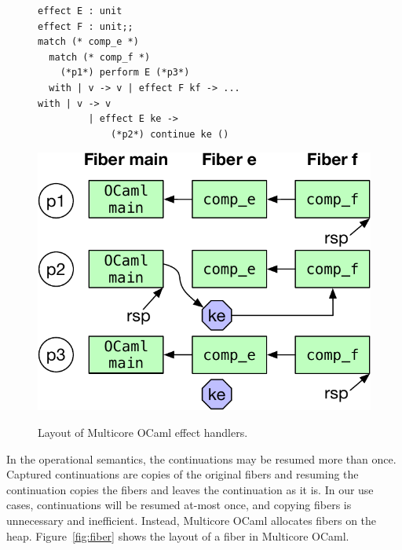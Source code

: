 \documentclass[sigplan,10pt,review,anonymous]{acmart}\settopmatter{printfolios=true,printccs=false,printacmref=false}
\newcommand{\mycaption}[1]{\vspace{-4mm}\caption{#1}}
\begin{document}
\begin{figure}
\begin{minipage}{0.64\linewidth}
\begin{minipage}{\linewidth}
    \label{fig:mcstack}
    \vspace{2mm}
  \end{minipage}
  \begin{minipage}{0.55\linewidth}
    \begin{lstlisting}
effect E : unit
effect F : unit;;
match (* comp_e *)
  match (* comp_f *)
    (*p1*) perform E (*p3*)
  with | v -> v | effect F kf -> ...
with | v -> v
		 | effect E ke ->
		     (*p2*) continue ke ()
    \end{lstlisting}
		\label{code:effimpl}
  \end{minipage}
  \begin{minipage}{0.44\linewidth}
    \centering
    \includegraphics[scale=0.42]{figures/fiber_handler}
    \label{fig:fiber_handler}
  \end{minipage}
\end{minipage}
\vspace{2mm}
\mycaption{Layout of Multicore OCaml effect handlers.}
\end{figure}

In the operational semantics, the continuations may be resumed more than once.
Captured continuations are copies of the original fibers and resuming the
continuation copies the fibers and leaves the continuation as it is. In our use
cases, continuations will be resumed at-most once, and copying fibers is
unnecessary and inefficient. Instead, Multicore OCaml allocates fibers on the
heap. Figure~\ref{fig:fiber} shows the layout of a fiber in Multicore OCaml.
\end{document}
